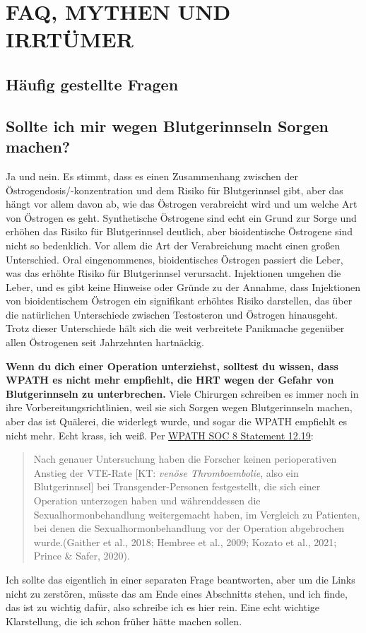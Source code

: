 \documentclass{article}
\begin{document}
 

\section{FAQ, MYTHEN UND IRRTÜMER}\label{MM}

\subsection*{Häufig gestellte Fragen}

\subsection{Sollte ich mir wegen Blutgerinnseln Sorgen machen?}\label{11-1}

Ja und nein. Es stimmt, dass es einen Zusammenhang zwischen der Östrogendosis/-konzentration und dem Risiko für Blutgerinnsel gibt, aber das hängt vor allem davon ab, wie das Östrogen verabreicht wird und um welche Art von Östrogen es geht. Synthetische Östrogene sind echt ein Grund zur Sorge und erhöhen das Risiko für Blutgerinnsel deutlich, aber bioidentische Östrogene sind nicht so bedenklich. Vor allem die Art der Verabreichung macht einen großen Unterschied. Oral eingenommenes, bioidentisches Östrogen passiert die Leber, was das erhöhte Risiko für Blutgerinnsel verursacht. Injektionen umgehen die Leber, und es gibt keine Hinweise oder Gründe zu der Annahme, dass Injektionen von bioidentischem Östrogen ein signifikant erhöhtes Risiko darstellen, das über die natürlichen Unterschiede zwischen Testosteron und Östrogen hinausgeht. Trotz dieser Unterschiede hält sich die weit verbreitete Panikmache gegenüber allen Östrogenen seit Jahrzehnten hartnäckig.

\textbf{Wenn du dich einer Operation unterziehst, solltest du wissen, dass WPATH es nicht mehr empfiehlt, die HRT wegen der Gefahr von Blutgerinnseln zu unterbrechen.} Viele Chirurgen schreiben es immer noch in ihre Vorbereitungsrichtlinien, weil sie sich Sorgen wegen Blutgerinnseln machen, aber das ist Quälerei, die widerlegt wurde, und sogar die WPATH empfiehlt es nicht mehr. Echt krass, ich weiß. Per \href{https://www.tandfonline.com/doi/pdf/10.1080/26895269.2022.2100644}{WPATH SOC 8 Statement 12.19}: \blockquote{Nach genauer Untersuchung haben die Forscher keinen perioperativen Anstieg der VTE-Rate [KT: \textit{venöse Thromboembolie}, also ein Blutgerinnsel] bei Transgender-Personen festgestellt, die sich einer Operation unterzogen haben und währenddessen die Sexualhormonbehandlung weitergemacht haben, im Vergleich zu Patienten, bei denen die Sexualhormonbehandlung vor der Operation abgebrochen wurde.(Gaither et al., 2018; Hembree et al., 2009; Kozato et al., 2021; Prince \& Safer, 2020).} Ich sollte das eigentlich in einer separaten Frage beantworten, aber um die Links nicht zu zerstören, müsste das am Ende eines Abschnitts stehen, und ich finde, das ist zu wichtig dafür, also schreibe ich es hier rein. Eine echt wichtige Klarstellung, die ich schon früher hätte machen sollen.
\end{document}
